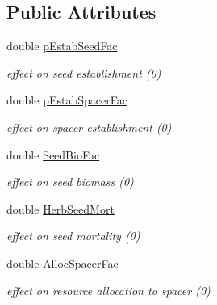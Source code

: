 \subsection*{Public Attributes}
\begin{DoxyCompactItemize}
\item 
\mbox{\label{struct_s_eff_profile_a68f0a1be89ef57a3e34899078ff812c0}} 
double \mbox{\hyperlink{struct_s_eff_profile_a68f0a1be89ef57a3e34899078ff812c0}{p\+Estab\+Seed\+Fac}}
\begin{DoxyCompactList}\small\item\em effect on seed establishment (0) \end{DoxyCompactList}\item 
\mbox{\label{struct_s_eff_profile_a4a26a011000c6d551a3a8225e44c5a83}} 
double \mbox{\hyperlink{struct_s_eff_profile_a4a26a011000c6d551a3a8225e44c5a83}{p\+Estab\+Spacer\+Fac}}
\begin{DoxyCompactList}\small\item\em effect on spacer establishment (0) \end{DoxyCompactList}\item 
\mbox{\label{struct_s_eff_profile_abad5d1225888ac7d64fec7d6e4860a73}} 
double \mbox{\hyperlink{struct_s_eff_profile_abad5d1225888ac7d64fec7d6e4860a73}{Seed\+Bio\+Fac}}
\begin{DoxyCompactList}\small\item\em effect on seed biomass (0) \end{DoxyCompactList}\item 
\mbox{\label{struct_s_eff_profile_a0d9ad6ea94d730dbabb78853b4817e96}} 
double \mbox{\hyperlink{struct_s_eff_profile_a0d9ad6ea94d730dbabb78853b4817e96}{Herb\+Seed\+Mort}}
\begin{DoxyCompactList}\small\item\em effect on seed mortality (0) \end{DoxyCompactList}\item 
\mbox{\label{struct_s_eff_profile_a5fc20715a6d447550b8614a71d51a4ff}} 
double \mbox{\hyperlink{struct_s_eff_profile_a5fc20715a6d447550b8614a71d51a4ff}{Alloc\+Spacer\+Fac}}
\begin{DoxyCompactList}\small\item\em effect on resource allocation to spacer (0) \end{DoxyCompactList}\item 

\end{DoxyCompactItemize}
